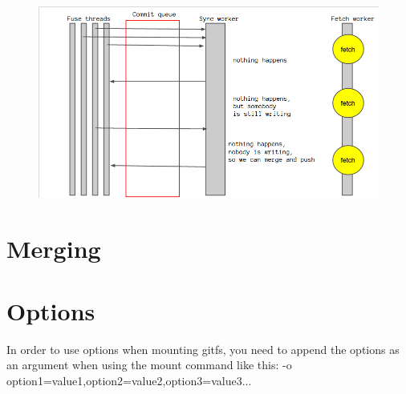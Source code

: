     \begin{figure}[h]
      \begin{center}
        \includegraphics[width=15cm]{concurrency/gitfs.png}
      \end{center}
   \end{figure}
\section{Merging}
\section{Options}
In order to use options when mounting gitfs, you need to append the options as an argument when using the mount command like this: -o option1=value1,option2=value2,option3=value3...

